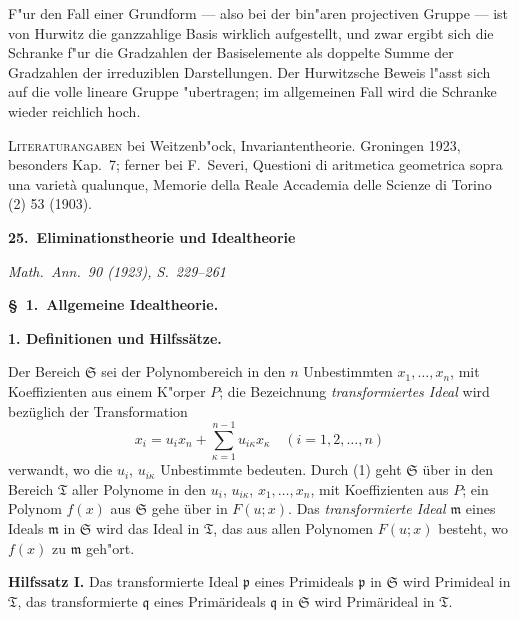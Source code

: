 \documentclass[12pt,a4paper]{article}
\begin{document}
{F"{u}r den Fall einer Grundform --- also bei der bin"{a}ren projectiven
Gruppe --- ist von Hurwitz die ganzzahlige Basis wirklich aufgestellt,
und zwar ergibt sich die Schranke f"{u}r die Gradzahlen der Basiselemente
als doppelte Summe der Gradzahlen der irreduziblen Darstellungen.
Der Hurwitzsche Beweis l"{a}sst sich auf die volle lineare Gruppe "{u}bertragen;
im allgemeinen Fall wird die Schranke wieder reichlich hoch.

\textsc{Literaturangaben} bei Weitzenb"{o}ck, Invariantentheorie. Groningen 1923,
besonders Kap.~7; ferner bei F.~Severi, Questioni di aritmetica geometrica
sopra una variet\`{a} qualunque, Memorie della Reale Accademia delle Scienze
di Torino (2) 53 (1903).

\vspace{2em}
\begin{center}
\Large\textbf{25.\ Eliminationstheorie und Idealtheorie}
\medskip

\normalsize\textit{Math.\ Ann.\ 90 (1923), S.~229--261}
\end{center}

\medskip
\noindent\textbf{\S~1.\ Allgemeine Idealtheorie.}
\medskip

\textbf{1. Definitionen und Hilfss\"{a}tze.}

Der Bereich $\mathfrak{S}$ sei der Polynombereich in den $n$ Unbestimmten $x_{1},\dots,x_{n}$,
mit Koeffizienten aus einem K"{o}rper $P$; die Bezeichnung \textit{transformiertes
Ideal} wird bez\"{u}glich der Transformation
\begin{equation}\tag{1}
x_{i}=u_{i}x_{n}+\sum_{\kappa=1}^{n-1}u_{i\kappa}x_{\kappa}\quad(i=1,2,\dots,n)
\end{equation}
verwandt, wo die $u_{i}$, $u_{i\kappa}$ Unbestimmte bedeuten. Durch (1) geht
$\mathfrak{S}$ \"{u}ber in den Bereich $\mathfrak{T}$ aller Polynome in den $u_{i}$, $u_{i\kappa}$, $x_{1},\dots,x_{n}$,
mit Koeffizienten aus $P$; ein Polynom $f(x)$ aus $\mathfrak{S}$ gehe \"{u}ber in $F(u;x)$.
Das \textit{transformierte Ideal} $\mathfrak{m}$ eines Ideals $\mathfrak{m}$ in $\mathfrak{S}$ wird das Ideal in $\mathfrak{T}$,
das aus allen Polynomen $F(u;x)$ besteht, wo $f(x)$ zu $\mathfrak{m}$ geh"{o}rt.

\textbf{Hilfssatz I.} Das transformierte Ideal $\mathfrak{p}$ eines Primideals $\mathfrak{p}$ in $\mathfrak{S}$
wird Primideal in $\mathfrak{T}$, das transformierte $\mathfrak{q}$ eines Prim\"{a}rideals $\mathfrak{q}$ in $\mathfrak{S}$ wird
Prim\"{a}rideal in $\mathfrak{T}$.

}
\end{document}
